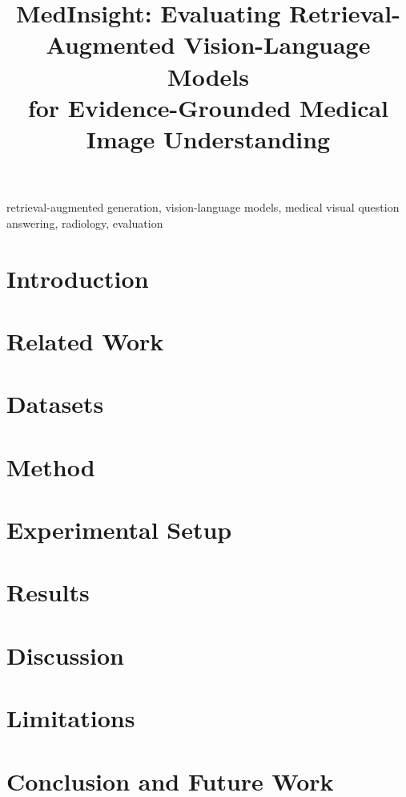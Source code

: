 \documentclass[conference]{IEEEtran}
\begin{document}
\title{MedInsight: Evaluating Retrieval-Augmented Vision-Language Models \\ for Evidence-Grounded Medical Image Understanding}

\author{
}

\maketitle

\begin{abstract}

\end{abstract}

\begin{IEEEkeywords}
retrieval-augmented generation, vision-language models, medical visual question answering, radiology, evaluation
\end{IEEEkeywords}

\section{Introduction}


\section{Related Work}


\section{Datasets}
\label{sec:datasets}


\section{Method}
\label{sec:method}


\section{Experimental Setup}
\label{sec:experimental_setup}


\section{Results}
\label{sec:results}


\section{Discussion}
\label{sec:discussion}


\section{Limitations}
\label{sec:limitations}


\section{Conclusion and Future Work}
\label{sec:conclusion}




\end{document}
